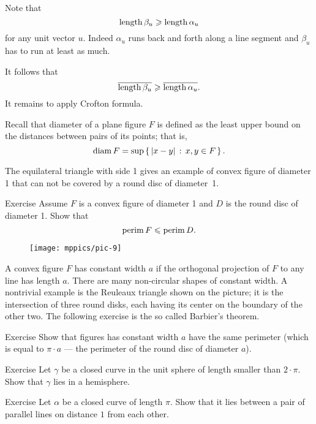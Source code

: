 Note that 
\[\mathop{\rm length}\nolimits \beta_u\geqslant \mathop{\rm length}\nolimits \alpha_u\]
for any unit vector $u$.
Indeed $\alpha_u$ runs back and forth along a line segment and $\beta_u$ has to run at least as much.

It follows that 
\[\overline{\mathop{\rm length}\nolimits \beta_u}\geqslant \overline{\mathop{\rm length}\nolimits \alpha_u}.\]
It remains to apply Crofton formula.
\qeds


Recall that diameter of a plane figure $F$ is defined as the least upper bound on the distances between pairs of its points;
that is,
\[\mathop{\rm diam}\nolimits F=\sup\left\{\,{|x-y|}\,:\,{x,y\in F}\,\right\}.\]

The equilateral triangle with side 1 gives an example of convex figure of diameter 1 that can not be covered by a round disc of diameter~1.

\begin{thm}{Exercise} 
Assume $F$ is a convex figure of diameter 1 and $D$ is the round disc of diameter 1.
Show that
\[\mathop{\rm perim}\nolimits F\leqslant \mathop{\rm perim}\nolimits D.\]
\end{thm}

\begin{wrapfigure}{r}{33 mm}
\vskip-5mm
\centering
\texttt{[image: mppics/pic-9]}
\end{wrapfigure}

A convex figure $F$ has constant width $a$ if the orthogonal projection of $F$ to any line has length $a$.
There are many non-circular shapes of constant width. 
A nontrivial example is the Reuleaux triangle shown on the picture;
it is the intersection of three round disks, each having its center on the boundary of the other two.
The following exercise is the so called Barbier's theorem.

\begin{thm}{Exercise} 
Show that figures has constant width $a$ have the same perimeter (which is equal to $\pi\cdot a$ --- the perimeter of the round disc of diameter $a$).
\end{thm}

\begin{thm}{Exercise} 
Let $\gamma$ be a closed curve in the unit sphere of length smaller than $2\cdot\pi$.
Show that $\gamma$ lies in a hemisphere.
\end{thm}

\begin{thm}{Exercise} 
Let $\alpha$ be a closed curve of length $\pi$.
Show that it lies between a pair of parallel lines on distance $1$ from each other.
\end{thm}

